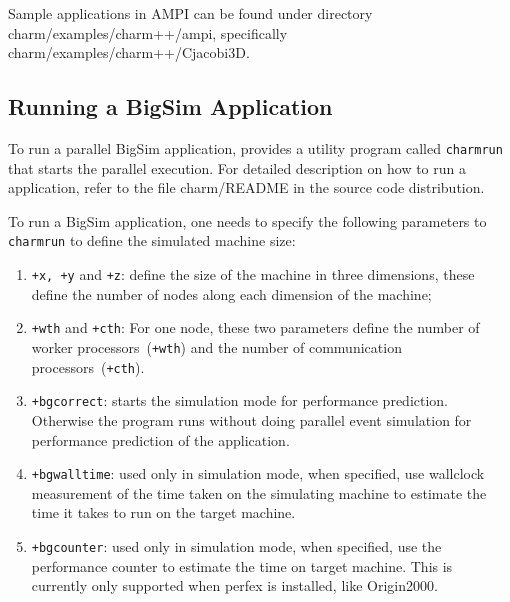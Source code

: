Sample applications in AMPI can be found under directory
        charm/examples/charm++/ampi, specifically charm/examples/charm++/Cjacobi3D.

        \subsection{Running a BigSim Application}

        To run a parallel BigSim application, \charmpp{} provides a utility program
        called {\tt charmrun} that starts the parallel execution.
For detailed description on how to run a \charmpp{} application, 
refer to the file charm/README in the source code distribution.

        To run a BigSim application, one needs to specify the following parameters to 
        {\tt charmrun} to define the simulated machine size:
\begin{enumerate}
\item {\tt +x, +y} and {\tt +z}:  define the size of the machine in three dimensions, these define the number of nodes along each dimension of the machine;
\item {\tt +wth} and {\tt +cth}:  For one node, these two parameters define the number of worker processors~({\tt +wth}) and the number of communication processors~({\tt +cth}).
\item {\tt +bgcorrect}: starts the simulation mode for performance prediction. Otherwise the program runs without doing parallel event simulation for performance prediction of the application.
\item {\tt +bgwalltime}: used only in simulation mode, when specified, use wallclock measurement of the time taken on the simulating machine to estimate the time it takes to run on the target machine.
\item {\tt +bgcounter}:  used only in simulation mode, when specified, use the performance counter to estimate the time on target machine. This is currently only supported when perfex is installed, like Origin2000.
\end{enumerate}

